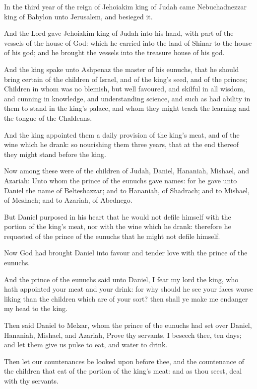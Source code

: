\Chapter
\Verse In the third year of the reign of Jehoiakim king of Judah came Nebuchadnezzar king of Babylon unto Jerusalem, and besieged it.

\Verse And the Lord gave Jehoiakim king of Judah into his hand, with part of the vessels of the house of God: which he carried into the land of Shinar to the house of his god; and he brought the vessels into the treasure house of his god.

\Verse And the king spake unto Ashpenaz the master of his eunuchs, that he should bring certain of the children of Israel, and of the king's seed, and of the princes; \Verse Children in whom was no blemish, but well favoured, and skilful in all wisdom, and cunning in knowledge, and understanding science, and such as had ability in them to stand in the king's palace, and whom they might teach the learning and the tongue of the Chaldeans.

\Verse And the king appointed them a daily provision of the king's meat, and of the wine which he drank: so nourishing them three years, that at the end thereof they might stand before the king.

\Verse Now among these were of the children of Judah, Daniel, Hananiah, Mishael, and Azariah: \Verse Unto whom the prince of the eunuchs gave names: for he gave unto Daniel the name of Belteshazzar; and to Hananiah, of Shadrach; and to Mishael, of Meshach; and to Azariah, of Abednego.

\Verse But Daniel purposed in his heart that he would not defile himself with the portion of the king's meat, nor with the wine which he drank: therefore he requested of the prince of the eunuchs that he might not defile himself.

\Verse Now God had brought Daniel into favour and tender love with the prince of the eunuchs.

\Verse And the prince of the eunuchs said unto Daniel, I fear my lord the king, who hath appointed your meat and your drink: for why should he see your faces worse liking than the children which are of your sort? then shall ye make me endanger my head to the king.

\Verse Then said Daniel to Melzar, whom the prince of the eunuchs had set over Daniel, Hananiah, Mishael, and Azariah, \Verse Prove thy servants, I beseech thee, ten days; and let them give us pulse to eat, and water to drink.

\Verse Then let our countenances be looked upon before thee, and the countenance of the children that eat of the portion of the king's meat: and as thou seest, deal with thy servants.

